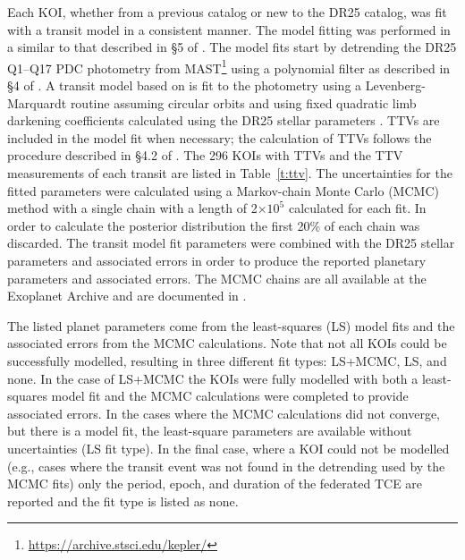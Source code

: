 \label{s:mcmc}

Each KOI, whether from a previous catalog or new to the DR25 catalog, was fit with a transit model in a consistent manner. The model fitting was performed in a similar to that described in \S5 of \citet{Rowe2015cat}. The model fits start by detrending the DR25 Q1--Q17 PDC photometry from MAST\footnote{\url{https://archive.stsci.edu/kepler/}} using a polynomial filter as described in \S4 of \citet{Rowe2014}. A transit model based on \citet{Mandel2002} is fit to the photometry using a Levenberg-Marquardt routine \citep{More1980} assuming circular orbits and using fixed quadratic limb darkening coefficients \citep{Claret2011} calculated using the DR25 stellar parameters \citep{Mathur2017ApJS}. TTVs are included in the model fit when necessary; the calculation of TTVs follows the procedure described in \S4.2 of \citet{Rowe2014}. The 296 KOIs with TTVs and the TTV measurements of each transit are listed in Table~\ref{t:ttv}. The uncertainties for the fitted parameters were calculated using a Markov-chain Monte Carlo (MCMC) method \citep{Ford2005AJ} with a single chain with a length of 2$\times 10^{5}$ calculated for each fit. In order to calculate the posterior distribution the first 20\% of each chain was discarded. The transit model fit parameters were combined with the DR25 stellar parameters and associated errors \citep{Mathur2017ApJS} in order to produce the reported planetary parameters and associated errors. The MCMC chains are all available at the Exoplanet Archive and are documented in \citet{Hoffman2017}. 

The listed planet parameters come from the least-squares (LS) model fits and the associated errors from the MCMC calculations. Note that not all KOIs could be successfully modelled, resulting in three different fit types: LS+MCMC, LS, and none. In the case of LS+MCMC the KOIs were fully modelled with both a least-squares model fit and the MCMC calculations were completed to provide associated errors. In the cases where the MCMC calculations did not converge, but there is a model fit, the least-square parameters are available without uncertainties (LS fit type). In the final case, where a KOI could not be modelled (e.g., cases where the transit event was not found in the detrending used by the MCMC fits) only the period, epoch, and duration of the federated TCE are reported and the fit type is listed as none.

